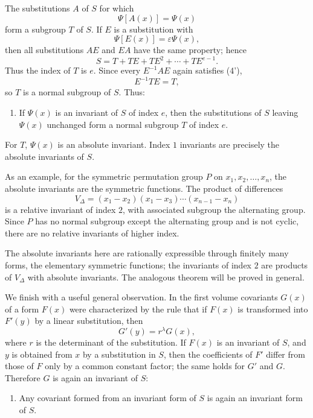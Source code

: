 \documentclass[11pt]{article}
\begin{document}
The substitutions $A$ of $S$ for which
\begin{equation}
\Psi[A(x)]=\Psi(x)
\tag{4'}
\end{equation}
form a subgroup $T$ of $S$. If $E$ is a substitution with
\begin{equation}
\Psi[E(x)]=\varepsilon\Psi(x),
\tag{5'}
\end{equation}
then all substitutions $AE$ and $EA$ have the same property; hence
\begin{equation}
S=T+TE+TE^2+\cdots+TE^{e-1}.
\tag{6}
\end{equation}
Thus the index of $T$ is $e$. Since every $E^{-1}AE$ again satisfies (4'),
\begin{equation}
E^{-1}TE=T,
\tag{7}
\end{equation}
so $T$ is a normal subgroup of $S$. Thus:
\begin{enumerate}[label=\arabic*.,leftmargin=2.2em,start=3]
\item If $\Psi(x)$ is an invariant of $S$ of index $e$, then the substitutions of $S$ leaving $\Psi(x)$ unchanged form a normal subgroup $T$ of index $e$.
\end{enumerate}
For $T$, $\Psi(x)$ is an absolute invariant. Index $1$ invariants are precisely the absolute invariants of $S$.

As an example, for the symmetric permutation group $P$ on $x_1,x_2,\ldots,x_n$, the absolute invariants are the symmetric functions. The product of differences
\[
V_\Delta=(x_1-x_2)(x_1-x_3)\cdots(x_{n-1}-x_n)
\]
is a relative invariant of index $2$, with associated subgroup the alternating group. Since $P$ has no normal subgroup except the alternating group and is not cyclic, there are no relative invariants of higher index.

The absolute invariants here are rationally expressible through finitely many forms, the elementary symmetric functions; the invariants of index $2$ are products of $V_\Delta$ with absolute invariants. The analogous theorem will be proved in general.

We finish with a useful general observation. In the first volume covariants $G(x)$ of a form $F(x)$ were characterized by the rule that if $F(x)$ is transformed into $F'(y)$ by a linear substitution, then
\[
G'(y)=r^\lambda G(x),
\]
where $r$ is the determinant of the substitution. If $F(x)$ is an invariant of $S$, and $y$ is obtained from $x$ by a substitution in $S$, then the coefficients of $F'$ differ from those of $F$ only by a common constant factor; the same holds for $G'$ and $G$. Therefore $G$ is again an invariant of $S$:
\begin{enumerate}[label=\arabic*.,leftmargin=2.2em,start=4]
\item Any covariant formed from an invariant form of $S$ is again an invariant form of $S$.
\end{enumerate}
\end{document}

